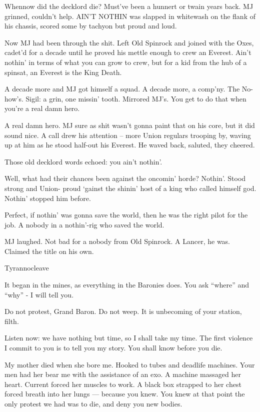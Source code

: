 Whennow did the decklord die? Must’ve been a hunnert or twain years back. MJ grinned, couldn’t  
help. AIN’T NOTHIN was slapped in whitewash on the flank of his chassis, scored some by  
tachyon but proud and loud.  

Now MJ had been through the shit. Left Old Spinrock and joined with the Oxes, cadet’d for a  
decade until he proved his mettle enough to crew an Everest. Ain’t nothin’ in terms of what you  
can grow to crew, but for a kid from the hub of a spinsat, an Everest is the King Death.   

A decade more and MJ got himself a squad. A decade more, a comp’ny. The No-how’s. Sigil: a  
grin, one missin’ tooth. Mirrored MJ’s. You get to do that when you’re a real damn hero.   

                                                                                                            


A real damn hero. MJ sure as shit wasn’t gonna paint that on his core, but it did sound nice. A call  
drew his attention -- more Union regulars trooping by, waving up at him as he stood half-out his  
Everest. He waved back, saluted, they cheered.    

Those old decklord words echoed: you ain’t nothin’.   

Well, what had their chances been against the oncomin’ horde? Nothin’. Stood strong and Union- 
proud ‘gainst the shinin’ host of a king who called himself god. Nothin’ stopped him before.   

Perfect, if nothin’ was gonna save the world, then he was the right pilot for the job. A nobody in a  
nothin’-rig who saved the world.   

MJ laughed. Not bad for a nobody from Old Spinrock. A Lancer, he was. Claimed the title on his  
own.   

Tyrannocleave    

It began in the mines, as everything in the Baronies does. You ask “where” and “why” - I will tell  
you.   

Do not protest, Grand Baron. Do not weep. It is unbecoming of your station, filth.     

Listen now: we have nothing but time, so I shall take my time. The first violence I commit to you is  
to tell you my story. You shall know before you die.   

My mother died when she bore me. Hooked to tubes and deadlife machines. Your men had her  
bear me with the assistance of an exo. A machine massaged her heart. Current forced her  
muscles to work. A black box strapped to her chest forced breath into her lungs — because you  
knew. You knew at that point the only protest we had was to die, and deny you new bodies.  

